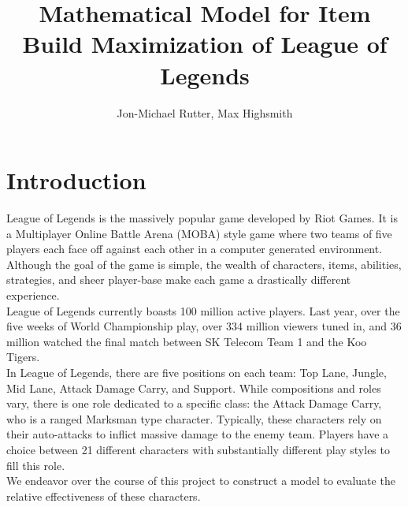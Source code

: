 \documentclass{article}
\begin{document}
\title{Mathematical Model for Item Build Maximization of League of Legends}
\author{Jon-Michael Rutter,  Max Highsmith}

\maketitle

\begin{abstract}

\end{abstract}

\section{Introduction}
League of Legends is the massively popular game developed by Riot Games.  It is a Multiplayer Online Battle Arena (MOBA) style game where two teams of five players each face off against each other in a computer generated environment.  Although the goal of the game is simple, the wealth of characters, items, abilities, strategies, and sheer player-base make each game a drastically different experience. \\
League of Legends currently boasts 100 million active players.  Last year, over the five weeks of World Championship play, over 334 million viewers tuned in, and 36 million watched the final match between SK Telecom Team 1 and the Koo Tigers.\\
In League of Legends, there are five positions on each team: Top Lane, Jungle, Mid Lane, Attack Damage Carry, and Support.  While compositions and roles vary, there is one role dedicated to a specific class: the Attack Damage Carry, who is a ranged Marksman type character.  Typically, these characters rely on their auto-attacks to inflict massive damage to the enemy team.  Players have a choice between 21 different characters with substantially different play styles to fill this role. \\
We endeavor over the course of this project to construct a model to evaluate the relative effectiveness of these characters.
\end{document}
